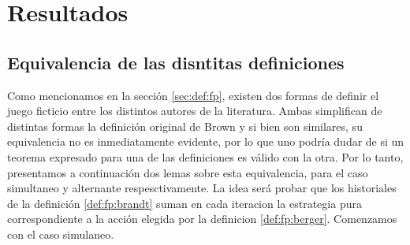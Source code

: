\chapter{Resultados}  \label{cap:aportes}

\section{Equivalencia de las disntitas definiciones}

Como mencionamos en la sección \ref{sec:def:fp}, existen dos formas de definir el juego ficticio entre los distintos autores de la literatura. Ambas simplifican de distintas formas la definición original de Brown y si bien son similares, su equivalencia no es inmediatamente evidente, por lo que uno podría dudar de si un teorema expresado para una de las definiciones es válido con la otra. Por lo tanto, presentamos a continuación dos lemas sobre esta equivalencia, para el caso simultaneo y alternante respesctivamente. La idea será probar que los historiales de la definición \ref{def:fp:brandt} suman en cada iteracion la estrategia pura correspondiente a la acción elegida por la definicion \ref{def:fp:berger}. Comenzamos con el caso simulaneo.

